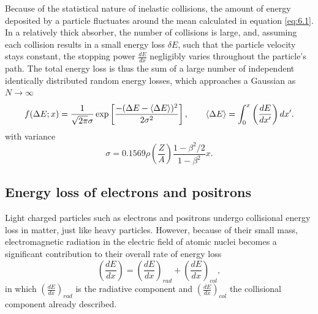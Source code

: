 Because of the statistical nature of inelastic collisions, the amount of energy deposited by a particle fluctuates around the mean calculated in equation \eqref{eq:6.1}. 
In a relatively thick absorber, the number of collisions is large, and, assuming each collision results in a small energy loss $\delta E$, 
such that the particle velocity stays constant, the stopping power $\frac{dE}{dx}$ negligibly varies throughout the particle's path.
The total energy loss is thus the sum of a large number of independent identically distributed random energy losses, which approaches a Gaussian as $N\rightarrow \infty$
\begin{equation}
    \label{eq:6.4}
    f(\Delta E; x) = \frac{1}{\sqrt{2\pi}\sigma } \exp \left[ \frac{-(\Delta E - \expval{\Delta E})^2}{2\sigma ^2} \right], \quad\quad \expval{\Delta E} = \int_0 ^ {x} \left(\frac{dE}{dx'} \right)dx'.
\end{equation}
with variance 
\begin{equation}
    \label{eq:6.5}
    \sigma = 0.1569 \rho \left( \frac{Z}{A} \right) \frac{1-\beta^2/2}{1-\beta^2} x.
\end{equation}

\subsection{Energy loss of electrons and positrons}
\label{subsect:e-loss-electron}
Light charged particles such as electrons and positrons undergo collisional energy loss in matter, just like heavy particles. However, because of their small mass, electromagnetic radiation in the electric field of atomic nuclei becomes a significant contribution to their overall rate of energy loss
\begin{equation}
    \label{eq:6.6}
    \left ( \frac{dE}{dx} \right) = \left ( \frac{dE}{dx} \right)_{rad} + \left ( \frac{dE}{dx} \right) _{col},
\end{equation}
in which $\left ( \frac{dE}{dx} \right)_{rad}$ is the radiative component and $\left ( \frac{dE}{dx} \right) _{col}$ the collisional component already described.

